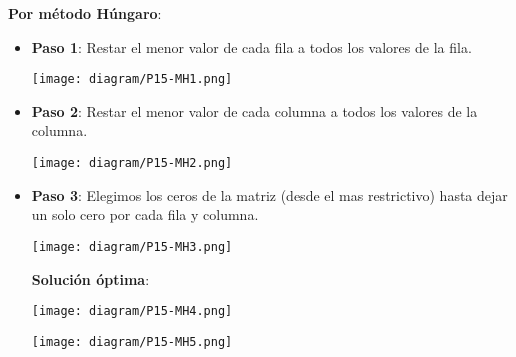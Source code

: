 \documentclass{templateNote}
\begin{document}
\newpage
\textbf{Por método Húngaro}:
\begin{itemize}
    \item \textbf{Paso 1}: Restar el menor valor de cada fila a todos los valores de la fila.
    \begin{center}
        \texttt{[image: diagram/P15-MH1.png]}
    \end{center}

    \item \textbf{Paso 2}: Restar el menor valor de cada columna a todos los valores de la columna.
    \begin{center}
        \texttt{[image: diagram/P15-MH2.png]}
    \end{center}

    \item \textbf{Paso 3}: Elegimos los ceros de la matriz (desde el mas restrictivo) hasta dejar un solo cero por cada fila y columna.
    \begin{center}
        \texttt{[image: diagram/P15-MH3.png]}
    \end{center}

    \textbf{Solución óptima}:

    \begin{minipage}{0.45\textwidth}
        \begin{center}
            \texttt{[image: diagram/P15-MH4.png]}
        \end{center}
    \end{minipage}
    \hfill
    \begin{minipage}{0.45\textwidth}
        \begin{center}
            \texttt{[image: diagram/P15-MH5.png]}
        \end{center}
    \end{minipage}
\end{itemize}

\newpage
\end{document}
